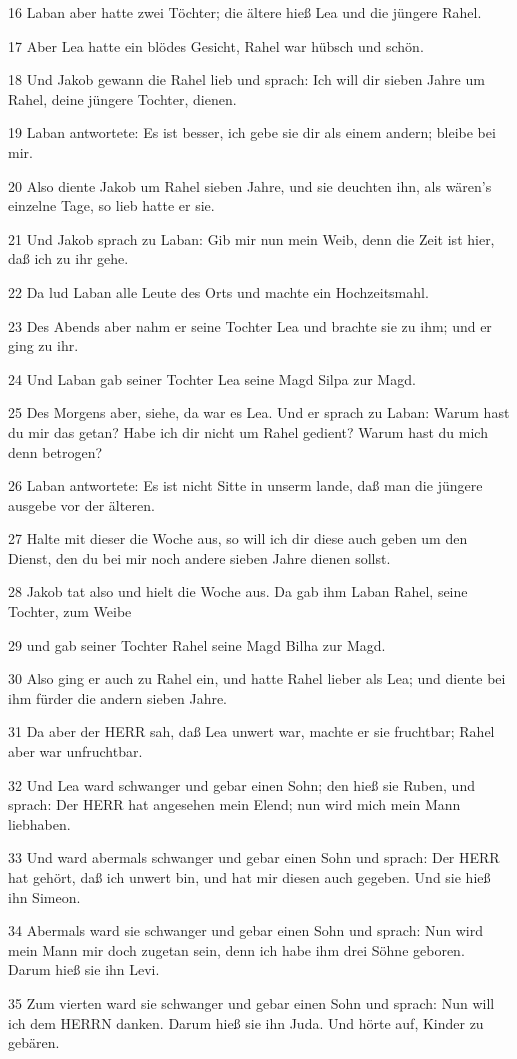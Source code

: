\par 16 Laban aber hatte zwei Töchter; die ältere hieß Lea und die jüngere Rahel.
\par 17 Aber Lea hatte ein blödes Gesicht, Rahel war hübsch und schön.
\par 18 Und Jakob gewann die Rahel lieb und sprach: Ich will dir sieben Jahre um Rahel, deine jüngere Tochter, dienen.
\par 19 Laban antwortete: Es ist besser, ich gebe sie dir als einem andern; bleibe bei mir.
\par 20 Also diente Jakob um Rahel sieben Jahre, und sie deuchten ihn, als wären's einzelne Tage, so lieb hatte er sie.
\par 21 Und Jakob sprach zu Laban: Gib mir nun mein Weib, denn die Zeit ist hier, daß ich zu ihr gehe.
\par 22 Da lud Laban alle Leute des Orts und machte ein Hochzeitsmahl.
\par 23 Des Abends aber nahm er seine Tochter Lea und brachte sie zu ihm; und er ging zu ihr.
\par 24 Und Laban gab seiner Tochter Lea seine Magd Silpa zur Magd.
\par 25 Des Morgens aber, siehe, da war es Lea. Und er sprach zu Laban: Warum hast du mir das getan? Habe ich dir nicht um Rahel gedient? Warum hast du mich denn betrogen?
\par 26 Laban antwortete: Es ist nicht Sitte in unserm lande, daß man die jüngere ausgebe vor der älteren.
\par 27 Halte mit dieser die Woche aus, so will ich dir diese auch geben um den Dienst, den du bei mir noch andere sieben Jahre dienen sollst.
\par 28 Jakob tat also und hielt die Woche aus. Da gab ihm Laban Rahel, seine Tochter, zum Weibe
\par 29 und gab seiner Tochter Rahel seine Magd Bilha zur Magd.
\par 30 Also ging er auch zu Rahel ein, und hatte Rahel lieber als Lea; und diente bei ihm fürder die andern sieben Jahre.
\par 31 Da aber der HERR sah, daß Lea unwert war, machte er sie fruchtbar; Rahel aber war unfruchtbar.
\par 32 Und Lea ward schwanger und gebar einen Sohn; den hieß sie Ruben, und sprach: Der HERR hat angesehen mein Elend; nun wird mich mein Mann liebhaben.
\par 33 Und ward abermals schwanger und gebar einen Sohn und sprach: Der HERR hat gehört, daß ich unwert bin, und hat mir diesen auch gegeben. Und sie hieß ihn Simeon.
\par 34 Abermals ward sie schwanger und gebar einen Sohn und sprach: Nun wird mein Mann mir doch zugetan sein, denn ich habe ihm drei Söhne geboren. Darum hieß sie ihn Levi.
\par 35 Zum vierten ward sie schwanger und gebar einen Sohn und sprach: Nun will ich dem HERRN danken. Darum hieß sie ihn Juda. Und hörte auf, Kinder zu gebären.

